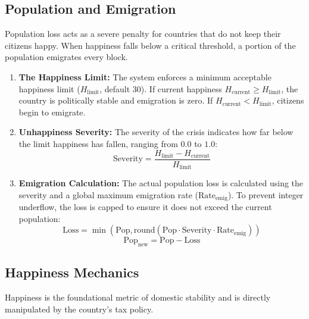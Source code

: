 \subsection{Population and Emigration}
Population loss acts as a severe penalty for countries that do not keep their citizens happy. When happiness falls below a critical threshold, a portion of the population emigrates every block.

\begin{enumerate}
    \item \textbf{The Happiness Limit:} The system enforces a minimum acceptable happiness limit ($H_{\text{limit}}$, default 30). If current happiness $H_{\text{current}} \ge H_{\text{limit}}$, the country is politically stable and emigration is zero. If $H_{\text{current}} < H_{\text{limit}}$, citizens begin to emigrate.

    \item \textbf{Unhappiness Severity:} The severity of the crisis indicates how far below the limit happiness has fallen, ranging from $0.0$ to $1.0$:
    \begin{equation}
    \text{Severity} = \frac{H_{\text{limit}} - H_{\text{current}}}{H_{\text{limit}}}
    \end{equation}

    \item \textbf{Emigration Calculation:} The actual population loss is calculated using the severity and a global maximum emigration rate ($\text{Rate}_{\text{emig}}$). To prevent integer underflow, the loss is capped to ensure it does not exceed the current population:
    \begin{equation}
    \text{Loss} = \min\left( \text{Pop}, \text{round}\left(\text{Pop} \cdot \text{Severity} \cdot \text{Rate}_{\text{emig}}\right) \right)
    \end{equation}
    \begin{equation}
    \text{Pop}_{\text{new}} = \text{Pop} - \text{Loss}
    \end{equation}
\end{enumerate}

\subsection{Happiness Mechanics}
Happiness is the foundational metric of domestic stability and is directly manipulated by the country's tax policy.


